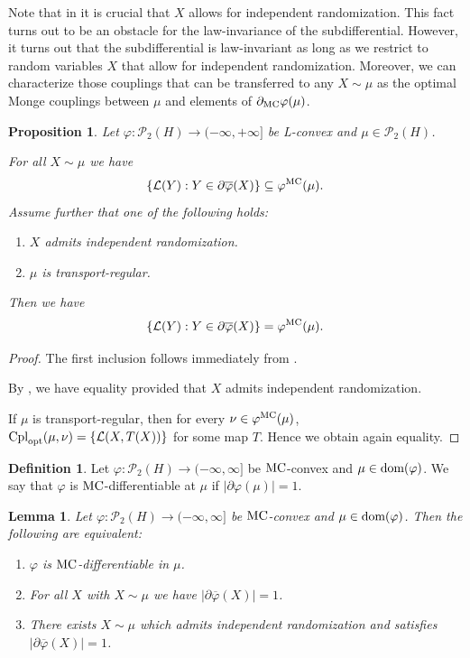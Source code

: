 \documentclass[a4paper]{amsart}
\numberwithin{theorem}{section}
\newtheorem{lemma}[theorem]{Lemma}
\newtheorem{proposition}[theorem]{Proposition}
\theoremstyle{definition}
\newtheorem{definition}[theorem]{Definition}
\newcommand{\law}{\mathcal{L}}
\newcommand{\dom}{\textup{dom}}
\newcommand{\cpl}{\textup{Cpl}}
\newcommand{\Pc}{\mathcal P}
\newcommand{\cplopt}{\cpl_{\rm opt}}
\renewcommand{\H}{H}
\renewcommand{\phi}{\varphi}
\newcommand{\mc}{\textup{MC}}
\newcommand{\MC}{\textup{MC}}
\begin{document}
Note that in  it is crucial that $X$ allows for independent randomization. This fact turns out to be an obstacle for the law-invariance of the subdifferential. However, it turns out that the subdifferential is law-invariant as long as we restrict to random variables $X$ that allow for independent randomization. Moreover, we can characterize those couplings that can be transferred to any $X \sim \mu$ as the optimal Monge couplings between $\mu$ and elements of $\partial_\mc\phi(\mu)$.  




\begin{proposition}\label{cor:LawInvSubDiffRandom}
Let $\phi: \Pc_2(\H) \to (-\infty, +\infty]$ be L-convex and $\mu\in \Pc_2(\H)$.  

For all $X\sim \mu$ we have $$ \{ \law(Y) : Y\in \partial \overline\phi(X) \} \subseteq \phi^\MC (\mu).$$
Assume further that one of the following holds:
\begin{enumerate}
    \item $X$ admits independent randomization.
    \item $\mu$ is transport-regular.
\end{enumerate}
Then we have
$$ \{ \law(Y) : Y\in \partial \overline\phi(X) \} = \phi^\MC (\mu).$$
\end{proposition}
\begin{proof}
The first inclusion  follows immediately from .

By , we have equality provided that $X$ admits independent randomization. 

If $\mu$ is transport-regular, then for every $\nu\in\phi^\MC (\mu)$, $\cplopt(\mu,\nu)=\{\law(X,T(X))\} $ for some map $T$. Hence we obtain again equality.   
\end{proof}






\begin{definition}\label{def:MCdiff}
    Let $\phi:\Pc_2(\H)\to (-\infty, \infty]$ be $\MC$-convex and $\mu\in \dom(\phi)$. We say that $\phi $ is $\MC$-differentiable at $\mu$ if $|\partial \phi(\mu)|=1$.
\end{definition}

\begin{lemma}\label{lem:mc_diff_char}
    Let $\phi:\Pc_2(\H)\to (-\infty, \infty]$ be $\MC$-convex and $\mu\in \dom(\phi)$. Then the following are equivalent: 
    \begin{enumerate}
        \item $\phi$ is $\MC$-differentiable in $\mu$.
        \item For all $X$ with $X\sim \mu$ we have $|\partial \overline \phi (X)|=1$.
        \item There exists $X\sim \mu$  which admits independent randomization and satisfies $|\partial \overline \phi (X)|=1$.
    \end{enumerate}
\end{lemma}
\end{document}
